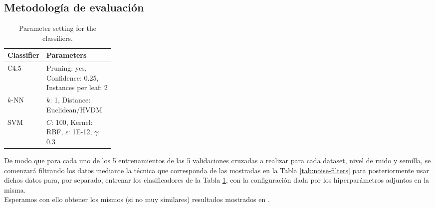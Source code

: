 \documentclass[print, color]{ugrTFG}
\begin{document}
 \subsection{Metodología de evaluación}
    \begin{table}
        \centering
        \small
        \caption{Parameter setting for the classifiers.}
        \label{tab:classifiers}
        \begin{tabularx}{\linewidth}{@{}p{0.25\linewidth}X@{}}
        \toprule
        Classifier & Parameters \\
        \midrule
        C4.5 & Pruning: yes, Confidence: 0.25, Instances per leaf: 2 \\
        $k$-NN & $k$: 1, Distance: Euclidean/HVDM \\
        SVM & $C$: 100, Kernel: RBF, $\epsilon$: 1E-12, $\gamma$: 0.3 \\
        \bottomrule
        \end{tabularx}
    \end{table}

 De modo que para cada uno de los 5 entrenamientos de las 5 validaciones cruzadas a realizar para cada dataset, nivel de ruido y semilla, se comenzará filtrando los datos mediante la técnica que corresponda de las mostradas en la Tabla \ref{tab:noise-filters} para posteriormente usar dichos datos para, por separado, entrenar los clasificadores de la Tabla \ref{tab:classifiers}, con la configuración dada por los hiperparámetros adjuntos en la misma.\\

 Esperamos con ello obtener los mismos (si no muy similares) resultados mostrados en \cite{LUENGO201827}.

\vspace{2.5cm}  
\end{document}
